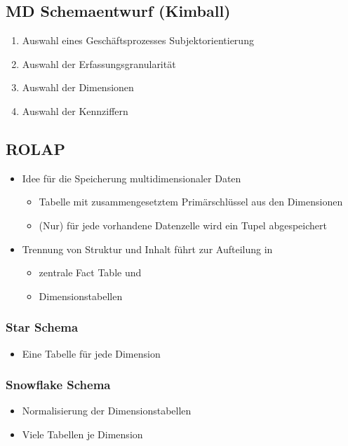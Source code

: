 \subsection{MD Schemaentwurf (Kimball)}
\begin{enumerate}
  \item Auswahl eines Geschäftsprozesses \rightarrow Subjektorientierung
  \item Auswahl der Erfassungsgranularität
  \item Auswahl der Dimensionen
  \item Auswahl der Kennziffern 
\end{enumerate}
\subsection{ROLAP}
\begin{itemize}
	\item Idee für die Speicherung multidimensionaler Daten
		\begin{itemize}
			\item Tabelle mit zusammengesetztem Primärschlüssel aus den Dimensionen
			\item (Nur) für jede vorhandene Datenzelle wird ein Tupel abgespeichert
		\end{itemize}
	\item Trennung von Struktur und Inhalt führt zur Aufteilung in
		\begin{itemize}
			\item zentrale \glqq{}Fact Table\grqq{} und
			\item Dimensionstabellen
		\end{itemize}
\end{itemize}
\subsubsection{Star Schema}
\begin{itemize}
	\item Eine Tabelle für jede Dimension
\end{itemize}
\subsubsection{Snowflake Schema}
\begin{itemize}
	\item Normalisierung der Dimensionstabellen
	\item Viele Tabellen je Dimension
\end{itemize}





















